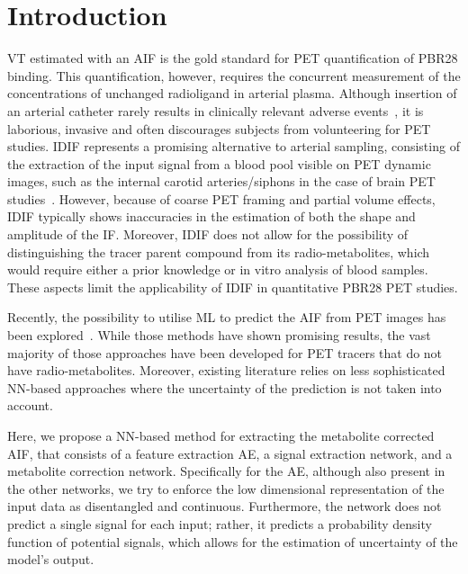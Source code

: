 \vspace{-0.5cm}

\section{Introduction} \label{sec:introduction}
     \gls{VT} estimated with an \gls{AIF} is the gold standard for \gls{PET} quantification of \gls{PBR28} binding. This quantification, however, requires the concurrent measurement of the concentrations of unchanged radioligand in arterial plasma. Although insertion of an arterial catheter rarely results in clinically relevant adverse events~\cite{Everett2009SafetySubjects}, it is laborious, invasive and often discourages subjects from volunteering for \gls{PET} studies. \gls{IDIF} represents a promising alternative to arterial sampling, consisting of the extraction of the input signal from a blood pool visible on \gls{PET} dynamic images, such as the internal carotid arteries/siphons in the case of brain \gls{PET} studies~\cite{Zanotti-Fregonara2011}. However, because of coarse \gls{PET} framing and partial volume effects, \gls{IDIF} typically shows inaccuracies in the estimation of both the shape and amplitude of the \gls{IF}. Moreover, \gls{IDIF} does not allow for the possibility of distinguishing the tracer parent compound from its radio-metabolites, which would require either a prior knowledge or in vitro analysis of blood samples. These aspects limit the applicability of \gls{IDIF} in quantitative \gls{PBR28} \gls{PET} studies.
    
    Recently, the possibility to utilise \gls{ML} to predict the \gls{AIF} from \gls{PET} images has been explored~\cite{Kuttner2020, Wang2020DirectImaging, Ferrante2022PhysicallyImaging}. While those methods have shown promising results, the vast majority of those approaches have been developed for \gls{PET} tracers that do not have radio-metabolites. Moreover, existing literature relies on less sophisticated \gls{NN}-based approaches where the uncertainty of the prediction is not taken into account.
    
    Here, we propose a \gls{NN}-based method for extracting the metabolite corrected \gls{AIF}, that consists of a feature extraction \gls{AE}, a signal extraction network, and a metabolite correction network. Specifically for the \gls{AE}, although also present in the other networks, we try to enforce the low dimensional representation of the input data as disentangled and continuous. Furthermore, the network does not predict a single signal for each input; rather, it predicts a probability density function of potential signals, which allows for the estimation of uncertainty of the model's output.
    
